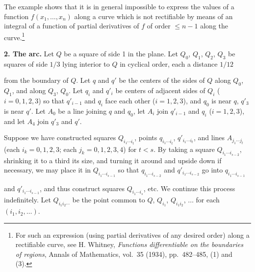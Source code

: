 \documentclass[11pt,a4paper,leqno,twoside]{article}
\newcommand{\sect}[1]{\par\medskip\noindent\textbf{#1}\enspace}
\begin{document}
The example shows that it is in general impossible to express the values of a function $f(x_1,\ldots,x_n)$ along a curve which is not rectifiable by means of an integral of a function of partial derivatives of $f$ of order $\leq n-1$ along the curve.\footnote{For such an expression (using partial derivatives of any desired order) along a rectifiable curve, see H. Whitney, \textit{Functions differentiable on the boundaries of regions}, Annals of Mathematics, vol.\ 35 (1934), pp.\ 482--485, (1) and (3).}

\sect{2. The arc.} Let $Q$ be a square of side 1 in the plane. Let $Q_0$, $Q_1$, $Q_2$, $Q_3$ be squares of side $1/3$ lying interior to $Q$ in cyclical order, each a distance $1/12$

\newpage %
\noindent from the boundary of $Q$. Let $q$ and $q'$ be the centers of the sides of $Q$ along $Q_0$, $Q_1$, and along $Q_3$, $Q_0$. Let $q_i$ and $q'_i$ be centers of adjacent sides of $Q_i$ ($i=0,1,2,3$) so that $q'_{i-1}$ and $q_i$ face each other ($i=1,2,3$), and $q_0$ is near $q$, $q'_3$ is near $q'$. Let $A_0$ be a line joining $q$ and $q_0$, let $A_i$ join $q'_{i-1}$ and $q_i$ ($i=1,2,3$), and let $A_4$ join $q'_3$ and $q'$.

Suppose we have constructed squares $Q_{i_1\cdots i_t}$, points $q_{i_1\cdots i_t}$, $q'_{i_1\cdots i_t}$, and lines $A_{j_1\cdots j_t}$ (each $i_k=0,1,2,3$; each $j_k=0,1,2,3,4$) for $t<s$. By taking a square $Q_{i_1\cdots i_{s-2}}$, shrinking it to a third its size, and turning it around and upside down if necessary, we may place it in $Q_{i_1\cdots i_{s-1}}$ so that $q_{i_1\cdots i_{s-2}}$ and $q'_{i_1\cdots i_{s-2}}$ go into $q_{i_1\cdots i_{s-1}}$
\begin{center}

\end{center}
\noindent and $q'_{i_1\cdots i_{s-1}}$, and thus construct squares $Q_{i_1\cdots i_s}$, etc. We continue this process indefinitely. Let $Q_{i_1i_2\cdots}$ be the point common to $Q$, $Q_{i_1}$, $Q_{i_1i_2}$, $\ldots$ for each $(i_1,i_2,\ldots)$.
\end{document}
